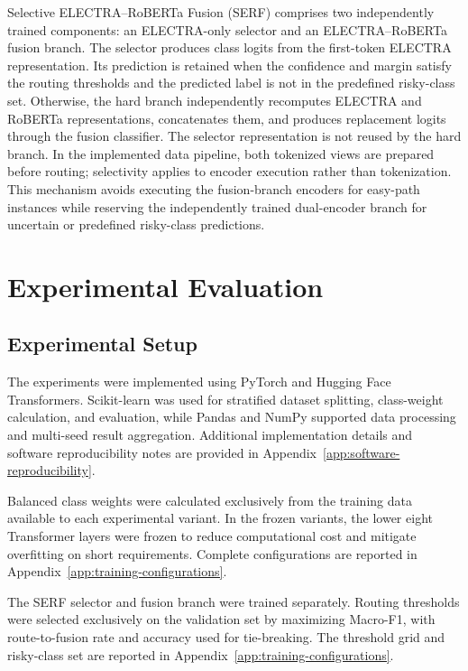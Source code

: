 \documentclass[runningheads]{llncs}
\begin{document}
Selective ELECTRA--RoBERTa Fusion (SERF) comprises two independently trained components: an ELECTRA-only selector and an ELECTRA--RoBERTa fusion branch. The selector produces class logits from the first-token ELECTRA representation. Its prediction is retained when the confidence and margin satisfy the routing thresholds and the predicted label is not in the predefined risky-class set. Otherwise, the hard branch independently recomputes ELECTRA and RoBERTa representations, concatenates them, and produces replacement logits through the fusion classifier. The selector representation is not reused by the hard branch. In the implemented data pipeline, both tokenized views are prepared before routing; selectivity applies to encoder execution rather than tokenization. This mechanism avoids executing the fusion-branch encoders for easy-path instances while reserving the independently trained dual-encoder branch for uncertain or predefined risky-class predictions.

\section{Experimental Evaluation}\label{sec:experimental-evaluation}

\subsection{Experimental Setup}\label{sec:experimental-setup}

The experiments were implemented using PyTorch and Hugging Face Transformers. Scikit-learn was used for stratified dataset splitting, class-weight calculation, and evaluation, while Pandas and NumPy supported data processing and multi-seed result aggregation. Additional implementation details and software reproducibility notes are provided in Appendix~\ref{app:software-reproducibility}.

Balanced class weights were calculated exclusively from the training data available to each experimental variant. In the frozen variants, the lower eight Transformer layers were frozen to reduce computational cost and mitigate overfitting on short requirements. Complete configurations are reported in Appendix~\ref{app:training-configurations}.

The SERF selector and fusion branch were trained separately. Routing thresholds were selected exclusively on the validation set by maximizing Macro-F1, with route-to-fusion rate and accuracy used for tie-breaking. The threshold grid and risky-class set are reported in Appendix~\ref{app:training-configurations}.
\end{document}
